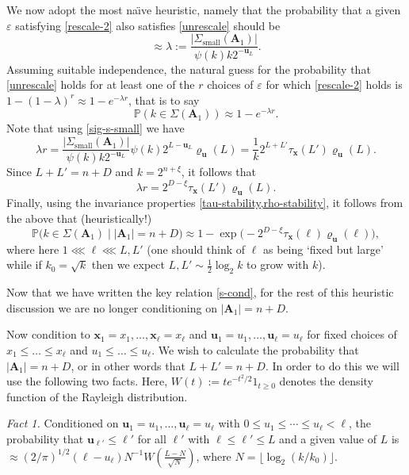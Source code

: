 \documentclass[11pt,reqno]{amsart}
\numberwithin{equation}{section}
\theoremstyle{definition}
\theoremstyle{remark}
\newcommand{\mb}{\mathbb}
\newcommand{\mbf}{\mathbf}
\newcommand{\eps}{\varepsilon}
\renewcommand{\le}{\leqslant}
\renewcommand{\ge}{\geqslant}
\def\sml{\operatorname{small}}
\begin{document}
We now adopt the most na\"{\i}ve heuristic, namely that the probability that a given $\eps$ satisfying \cref{rescale-2} also satisfies \cref{unrescale} should be
\[ \approx \lambda := \frac{ |\Sigma_{\sml}(\mbf{A}_1)|}{\psi(k) k 2^{-\mbf{u}_L}} .\]
Assuming suitable independence, the natural guess for the probability that \cref{unrescale} holds for at least one of the $r$ choices of $\eps$ for which \cref{rescale-2} holds is $1 - (1 - \lambda)^r \approx 1 - e^{-\lambda r}$, that is to say
\begin{equation}\label{prob-k-s} \mb{P}(k \in \Sigma(\mbf{A}_1)) \approx 1 - e^{-\lambda r}.\end{equation}
Note that using \cref{sig-s-small} we have
\[ \lambda r = \frac{ |\Sigma_{\sml}(\mbf{A}_1)|}{\psi(k) k 2^{-\mbf{u}_L}}   \psi(k) 2^{L - \mbf{u}_L} \varrho_{\mbf{u}}(L) = \frac{1}{k}2^{L + L'} \tau_{\mbf{x}}(L') \varrho_{\mbf{u}}(L). \]
Since $L + L' = n + D$ and $k = 2^{n + \xi}$, it follows that
\[ \lambda r = 2^{D - \xi}\tau_{\mbf{x}}(L') \varrho_{\mbf{u}}(L). \] Finally, using the invariance properties \cref{tau-stability,rho-stability}, it follows from the above that (heuristically!)
\begin{equation}\label{s-cond} \mb{P}\big(k \in \Sigma(\mbf{A}_1) \mid |\mbf{A}_1| = n + D \big) \approx 1 - \exp\big({-}2^{D - \xi}\tau_{\mbf{x}}(\ell)\varrho_{\mbf{u}}(\ell)\big), \end{equation} where here $1 \lll \ell \lll L, L'$ (one should think of $\ell$ as being `fixed but large' while if $k_0 = \sqrt{k}$ then we expect $L, L' \sim \frac{1}{2}\log_2 k$ to grow with $k$). 

Now that we have written the key relation \cref{s-cond}, for the rest of this heuristic discussion we are no longer conditioning on $|\mbf{A}_1| = n + D$.

Now condition to $\mbf{x}_1 = x_1, \dots, \mbf{x}_{\ell} = x_{\ell}$ and $\mbf{u}_1 = u_1,\dots, \mbf{u}_{\ell} = u_{\ell}$ for fixed choices of $x_1 \le \dots \le x_{\ell}$ and $u_1 \le\dots \le u_{\ell}$. We wish to calculate the probability that $|\mbf{A}_1| = n + D$, or in other words that $L + L' = n + D$. In order to do this we will use the following two facts. Here, $W(t) := t e^{-t^2/2} 1_{t \ge 0}$ denotes the density function of the Rayleigh distribution.\vspace*{5pt}


\emph{Fact 1.} Conditioned on $\mbf{u}_1 = u_1,\dots, \mbf{u}_{\ell} = u_{\ell}$ with $0 \le u_1 \le \cdots \le u_{\ell} < \ell$, the probability that $\mbf{u}_{\ell'} \le \ell'$ for all $\ell'$ with $\ell \le \ell' \le L$ and a given value of $L$ is $\approx (2/\pi)^{1/2} (\ell - u_\ell) N^{-1} W(\frac{L - N}{\sqrt{N}})$, where $N = \lfloor \log_2 (k/k_0)\rfloor$.\vspace*{5pt}
\end{document}
